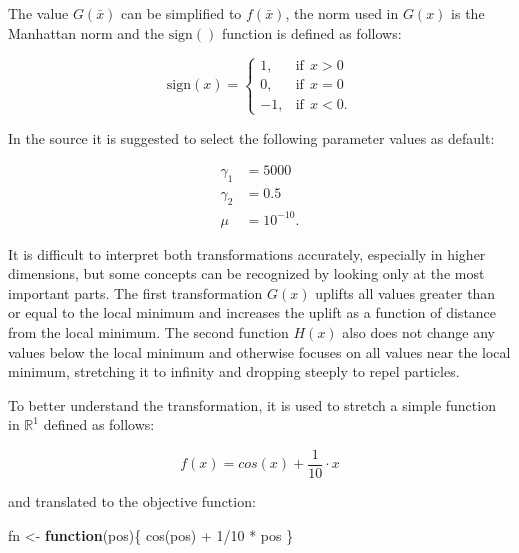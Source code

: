 \documentclass[
  oneside, a4paper, 12pt, openany]{book}
\newenvironment{Shaded}{\begin{snugshade}}{\end{snugshade}}
\newcommand{\ControlFlowTok}[1]{\textcolor[rgb]{0.13,0.29,0.53}{\textbf{#1}}}
\newcommand{\DecValTok}[1]{\textcolor[rgb]{0.00,0.00,0.81}{#1}}
\newcommand{\FunctionTok}[1]{\textcolor[rgb]{0.00,0.00,0.00}{#1}}
\newcommand{\NormalTok}[1]{#1}
\newcommand{\OtherTok}[1]{\textcolor[rgb]{0.56,0.35,0.01}{#1}}
\newcommand{\SpecialCharTok}[1]{\textcolor[rgb]{0.00,0.00,0.00}{#1}}
\theoremstyle{definition}
\theoremstyle{definition}
\theoremstyle{definition}
\theoremstyle{definition}
\theoremstyle{remark}
\begin{document}
The value \(G(\bar{x})\) can be simplified to \(f(\bar{x})\), the norm used in \(G(x)\) is the Manhattan norm and the \(\text{sign}()\) function is defined as follows:

\[
  \text{sign}(x) = 
  \begin{cases}
    1, & \text{if}\ \ x > 0\\
    0, & \text{if}\ \ x = 0\\
    -1, & \text{if}\ \ x < 0.
  \end{cases}
\]

In the source it is suggested to select the following parameter values as default:

\begin{align*}
  \gamma_1 &= 5000 \\
  \gamma_2 &= 0.5 \\
  \mu &= 10^{-10}.
\end{align*}

It is difficult to interpret both transformations accurately, especially in higher dimensions, but some concepts can be recognized by looking only at the most important parts. The first transformation \(G(x)\) uplifts all values greater than or equal to the local minimum and increases the uplift as a function of distance from the local minimum. The second function \(H(x)\) also does not change any values below the local minimum and otherwise focuses on all values near the local minimum, stretching it to infinity and dropping steeply to repel particles.

To better understand the transformation, it is used to stretch a simple function in \(\mathbb{R}^1\) defined as follows:

\[
f(x) = cos(x)+\frac{1}{10}\cdot x
\]

and translated to the objective function:

\vspace{0.1cm}\fontsize{11}{12}\selectfont

\begin{Shaded}
\begin{Highlighting}[]
\NormalTok{fn }\OtherTok{\textless{}{-}} \ControlFlowTok{function}\NormalTok{(pos)\{}
  \FunctionTok{cos}\NormalTok{(pos) }\SpecialCharTok{+} \DecValTok{1}\SpecialCharTok{/}\DecValTok{10} \SpecialCharTok{*}\NormalTok{ pos}
\NormalTok{\}}
\end{Highlighting}
\end{Shaded}

\normalsize\vspace{0.1cm}
\end{document}
